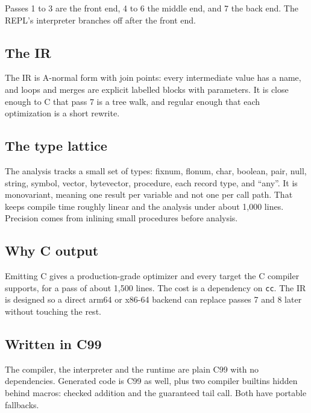 \documentclass[a4paper,11pt]{article}
\begin{document}
Passes 1 to 3 are the front end, 4 to 6 the middle end, and 7 the back end.
The REPL's interpreter branches off after the front end.

\subsection{The IR}

The IR is A-normal form with join points: every intermediate value has a
name, and loops and merges are explicit labelled blocks with parameters. It
is close enough to C that pass 7 is a tree walk, and regular enough that
each optimization is a short rewrite.

\subsection{The type lattice}

The analysis tracks a small set of types: fixnum, flonum, char, boolean,
pair, null, string, symbol, vector, bytevector, procedure, each record type,
and ``any''. It is monovariant, meaning one result per variable and not one
per call path. That keeps compile time roughly linear and the analysis under
about 1,000 lines. Precision comes from inlining small procedures before
analysis.

\subsection{Why C output}

Emitting C gives a production-grade optimizer and every target the C
compiler supports, for a pass of about 1,500 lines. The cost is a dependency
on \texttt{cc}. The IR is designed so a direct arm64 or x86-64 backend can
replace passes 7 and 8 later without touching the rest.

\subsection{Written in C99}

The compiler, the interpreter and the runtime are plain C99 with no
dependencies. Generated code is C99 as well, plus two compiler builtins
hidden behind macros: checked addition and the guaranteed tail call. Both
have portable fallbacks.
\end{document}
